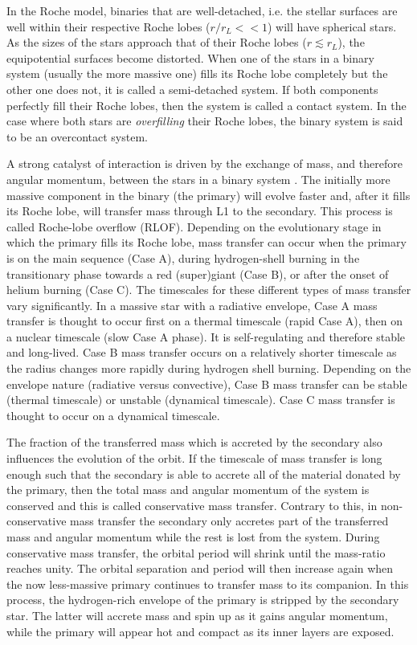 In the Roche model, binaries that are well-detached, i.e. the stellar surfaces are well within their respective Roche lobes ($r/r_L << 1$) will have spherical stars. As the sizes of the stars approach that of their Roche lobes ($r \lesssim r_L$), the equipotential surfaces become distorted. When one of the stars in a binary system (usually the more massive one) fills its Roche lobe completely but the other one does not, it is called a semi-detached system. If both components perfectly fill their Roche lobes, then the system is called a contact system. In the case where both stars are \textit{overfilling} their Roche lobes, the binary system is said to be an overcontact system.

A strong catalyst of interaction is driven by the exchange of mass, and therefore angular momentum, between the stars in a binary system \citep[see, e.g.,][]{1967Paczynski,2013deMink,1992podsiadlowski}. The initially more massive component in the binary (the primary) will evolve faster and, after it fills its Roche lobe, will transfer mass through L1 to the secondary. This process is called Roche-lobe overflow (RLOF). Depending on the evolutionary stage in which the primary fills its Roche lobe, mass transfer can occur when the primary is on the main sequence (Case A), during hydrogen-shell burning in the transitionary phase towards a red (super)giant (Case B), or after the onset of helium burning (Case C). The timescales for these different types of mass transfer vary significantly. In a massive star with a radiative envelope, Case A mass transfer is thought to occur first on a thermal timescale (rapid Case A), then on a nuclear timescale (slow Case A phase). It is self-regulating and therefore stable and long-lived. Case B mass transfer occurs on a relatively shorter timescale as the radius changes more rapidly during hydrogen shell burning. Depending on the envelope nature (radiative versus convective), Case B mass transfer can be stable (thermal timescale) or unstable (dynamical timescale). Case C mass transfer is thought to occur on a dynamical timescale.

The fraction of the transferred mass which is accreted by the secondary also influences the evolution of the orbit. If the timescale of mass transfer is long enough such that the secondary is able to accrete all of the material donated by the primary, then the total mass and angular momentum of the system is conserved and this is called conservative mass transfer. Contrary to this, in non-conservative mass transfer the secondary only accretes part of the transferred mass and angular momentum while the rest is lost from the system. During conservative mass transfer, the orbital period will shrink until the mass-ratio reaches unity. The orbital separation and period will then increase again when the now less-massive primary continues to transfer mass to its companion. In this process, the hydrogen-rich envelope of the primary is stripped by the secondary star. The latter will accrete mass and spin up as it gains angular momentum, while the primary will appear hot and compact as its inner layers are exposed.

